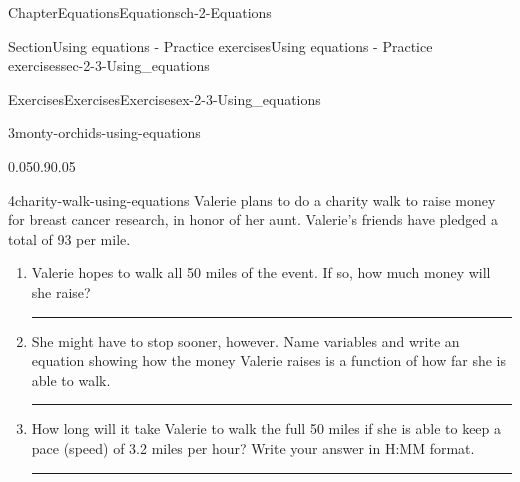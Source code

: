 \documentclass[twoside,11pt,]{book}
\newlength{\workspacestrutwidth}
\numberwithin{equation}{section}
\newcommand{\amp}{&}
\begin{document}
\begin{chapterptx}{Chapter}{Equations}{}{Equations}{}{}{ch-2-Equations}
\begin{sectionptx}{Section}{Using equations - Practice exercises}{}{Using equations - Practice exercises}{}{}{sec-2-3-Using_equations}
\begin{exercises-subsection-numberless}{Exercises}{Exercises}{}{Exercises}{}{}{ex-2-3-Using_equations}
\begin{divisionexercise}{3}{}{}{monty-orchids-using-equations}
\begin{enumerate}[label=(\alph*),ref=\alph*]
\begin{image}{0.05}{0.9}{0.05}{}
\end{image}%
\end{enumerate}%
\end{divisionexercise}%
\clearpage
\begin{divisionexercise}{4}{}{}{charity-walk-using-equations}%
Valerie plans to do a charity walk to raise money for breast cancer research, in honor of her aunt. Valerie's friends have pledged a total of \textdollar{}93 per mile.%
\begin{enumerate}[label=(\alph*),ref=\alph*]%
\item{}Valerie hopes to walk all 50 miles of the event. If so, how much money will she raise?%
\par\rule{\workspacestrutwidth}{1.5cm}%
\item{}She might have to stop sooner, however. Name variables and write an equation showing how the money Valerie raises is a function of how far she is able to walk.%
\par
    \hspace{-2cm}
%
%
\par\rule{\workspacestrutwidth}{1.5cm}%
\item{}How long will it take Valerie to walk the full 50 miles if she is able to keep a pace (speed) of 3.2 miles per hour? Write your answer in H:MM format.%
\par\rule{\workspacestrutwidth}{1.5cm}%

\end{enumerate}
\end{divisionexercise}
\end{exercises-subsection-numberless}
\end{sectionptx}
\end{chapterptx}
\end{document}
